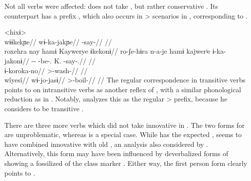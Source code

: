 Not all  verbs were affected: \waiwai {}  does not take , but rather conservative  .
Its \hixka counterpart has a prefix  , which also occurs in > scenarios in \hixka {}, corresponding to \waiwai {} .

\pex<hixɨ>
 \waiwai \parencite[][71]{waiwaihawkins1998}\\
\begingl
\glpreamble wɨɨkekɲe//
\gla wɨ-ka-jakɲe//
\glb {}-say-//
\glft {}//
\endgl
{} \hixka \parencite[][124]{hixkaryanaderby1985}\\
\begingl
\glpreamble roxehra nay hamɨ Kaywerye ɨkekonɨ//
\gla ro-ʃe-hɨra n-a-je hamɨ kajwerʲe ɨ-ka-jakonɨ//
\glb {}-- -be-.  K. -say-.//
\glft {}//
\endgl
{} \hixka \parencite[][191]{hixkaryanaderby1985}\\
\begingl
\gla ɨ-koroka-no//
\glb {}>-wash-//
\glft {}//
\endgl
{} \waiwai \parencite[][192]{waiwaihawkins1998}\\
\begingl
\glpreamble wîyesî//
\gla wɨ-jo-jasɨ//
\glb {}>-boil-//
\glft {}//
\endgl
\xe
%
The regular correspondence in transitive verbs points to \hixka {} on intransitive verbs as another reflex of , with a similar phonological reduction as in \ikpeng {}.
Notably, \textcite{hixkaryanaderby1985} analyzes this  as the regular > prefix, because he considers \hixka {}  to be transitive .

There are three more verbs which did not take innovative  in \PWai {}.
The two forms for  are unproblematic, whereas  is a special case.
While \hixka has the expected , \waiwai seems to have combined innovative  with  old , an analysis also considered by \textcite[90]{gildea1998}.
Alternatively, this form may have been influenced by deverbalized forms of  showing a fossilized of the  class marker   .
%
%
Either way, the first person form \hixka {} clearly points to \PWai {}.

